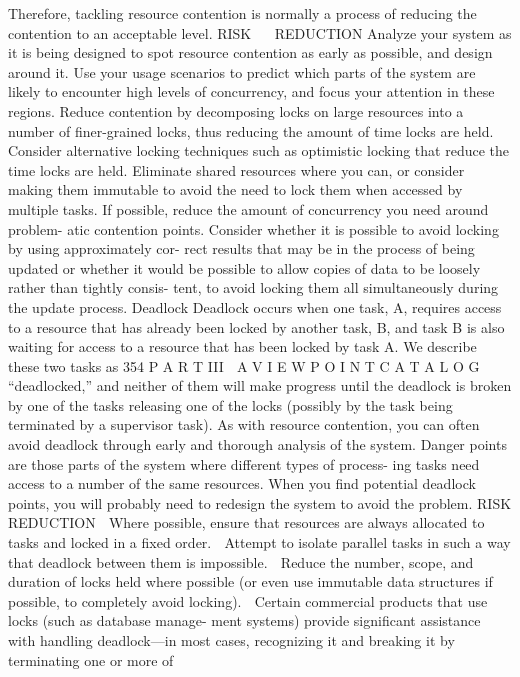 Therefore, tackling resource contention is normally a process of reducing the
contention to an acceptable level.
RISKREDUCTION
Analyze your system as it is being designed to spot resource contention
as early as possible, and design around it. Use your usage scenarios to
predict which parts of the system are likely to encounter high levels of
concurrency, and focus your attention in these regions.
Reduce contention by decomposing locks on large resources into a number
of finer-grained locks, thus reducing the amount of time locks are held.
Consider alternative locking techniques such as optimistic locking that
reduce the time locks are held.
Eliminate shared resources where you can, or consider making them
immutable to avoid the need to lock them when accessed by multiple
tasks.
If possible, reduce the amount of concurrency you need around problem-
atic contention points.
Consider whether it is possible to avoid locking by using approximately cor-
rect results that may be in the process of being updated or whether it would
be possible to allow copies of data to be loosely rather than tightly consis-
tent, to avoid locking them all simultaneously during the update process.
Deadlock
Deadlock occurs when one task, A, requires access to a resource that has
already been locked by another task, B, and task B is also waiting for access
to a resource that has been locked by task A. We describe these two tasks as
354
 P A R T III  A V I E W P O I N T C A T A L O G
“deadlocked,” and neither of them will make progress until the deadlock is
broken by one of the tasks releasing one of the locks (possibly by the task
being terminated by a supervisor task). As with resource contention, you can
often avoid deadlock through early and thorough analysis of the system.
Danger points are those parts of the system where different types of process-
ing tasks need access to a number of the same resources. When you find
potential deadlock points, you will probably need to redesign the system to
avoid the problem.
RISK REDUCTION
 Where possible, ensure that resources are always allocated to tasks and
locked in a fixed order.
 Attempt to isolate parallel tasks in such a way that deadlock between
them is impossible.
 Reduce the number, scope, and duration of locks held where possible
(or even use immutable data structures if possible, to completely avoid
locking).
 Certain commercial products that use locks (such as database manage-
ment systems) provide significant assistance with handling deadlock—in
most cases, recognizing it and breaking it by terminating one or more of

